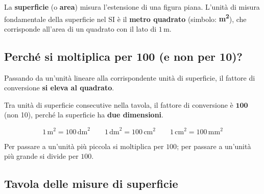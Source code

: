 \begin{definizione}
    La \textbf{superficie} (o \textbf{area}) misura l'estensione di una figura piana. L'unità di misura fondamentale della superficie nel SI è il \textbf{metro quadrato} (simbolo: \textbf{m\textsuperscript{2}}), che corrisponde all'area di un quadrato con il lato di $1\,\text{m}$.
\end{definizione}

\subsection{Perché si moltiplica per 100 (e non per 10)?}

Passando da un'unità lineare alla corrispondente unità di superficie, il fattore di conversione \textbf{si eleva al quadrato}.

\begin{center}
\end{center}

\begin{regola}
    Tra unità di superficie consecutive nella tavola, il fattore di conversione è $\mathbf{100}$ (non 10), perché la superficie ha \textbf{due dimensioni}.

    \[
        1\,\text{m}^2 = 100\,\text{dm}^2 \qquad 1\,\text{dm}^2 = 100\,\text{cm}^2 \qquad 1\,\text{cm}^2 = 100\,\text{mm}^2
    \]

    Per passare a un'unità più piccola si moltiplica per $100$; per passare a un'unità più grande si divide per $100$.
\end{regola}

\subsection{Tavola delle misure di superficie}

